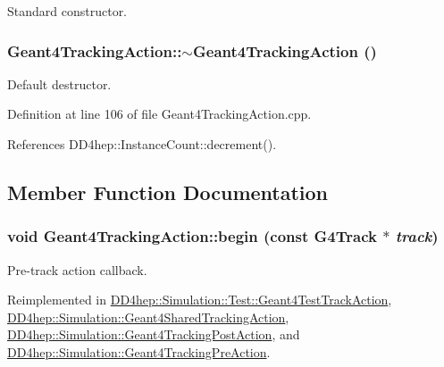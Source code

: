Standard constructor. \hypertarget{class_d_d4hep_1_1_simulation_1_1_geant4_tracking_action_a2647e6b8f311448fa99c20c487df3782}{
\subsubsection[{$\sim$Geant4TrackingAction}]{\setlength{\rightskip}{0pt plus 5cm}Geant4TrackingAction::$\sim$Geant4TrackingAction ()}}
\label{class_d_d4hep_1_1_simulation_1_1_geant4_tracking_action_a2647e6b8f311448fa99c20c487df3782}


Default destructor. 

Definition at line 106 of file Geant4TrackingAction.cpp.

References DD4hep::InstanceCount::decrement().

\subsection{Member Function Documentation}
\hypertarget{class_d_d4hep_1_1_simulation_1_1_geant4_tracking_action_a65858867a7b71bf4f48b9f140bc9a88d}{
\subsubsection[{begin}]{\setlength{\rightskip}{0pt plus 5cm}void Geant4TrackingAction::begin (const G4Track $\ast$ {\em track})}}
\label{class_d_d4hep_1_1_simulation_1_1_geant4_tracking_action_a65858867a7b71bf4f48b9f140bc9a88d}


Pre-\/track action callback. 

Reimplemented in \hyperlink{class_d_d4hep_1_1_simulation_1_1_test_1_1_geant4_test_track_action_a461ee9be4bf51bcfac397d093fb55fb8}{DD4hep::Simulation::Test::Geant4TestTrackAction}, \hyperlink{class_d_d4hep_1_1_simulation_1_1_geant4_shared_tracking_action_a67db960b642ca48cc171c0d1296e4125}{DD4hep::Simulation::Geant4SharedTrackingAction}, \hyperlink{class_d_d4hep_1_1_simulation_1_1_geant4_tracking_post_action_a3460d57b0bf474e1b83a3302056cf716}{DD4hep::Simulation::Geant4TrackingPostAction}, and \hyperlink{class_d_d4hep_1_1_simulation_1_1_geant4_tracking_pre_action_a1a4535994e5225ef10c47164a21deb92}{DD4hep::Simulation::Geant4TrackingPreAction}.

